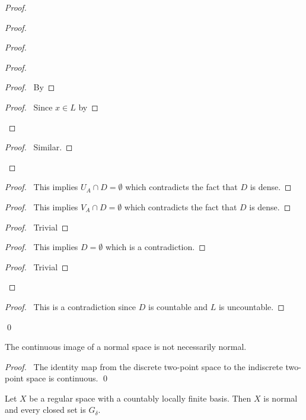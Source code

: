 \begin{proof}
\begin{proof}
\begin{proof}
\begin{proof}
\begin{proof}
      \pf\ By 
    \end{proof}
    \begin{proof}
      \pf\ Since $x \in L$ by 
    \end{proof}
  \end{proof}
  \begin{proof}
    \pf\ Similar.
  \end{proof}
\end{proof}
\begin{proof}
  \pf\ This implies $U_A \cap D = \emptyset$ which contradicts the fact that
  $D$ is dense.
\end{proof}
\begin{proof}
  \pf\ This implies $V_A \cap D = \emptyset$ which contradicts the fact that
  $D$ is dense.
\end{proof}
\begin{proof}
  \pf\ Trivial
\end{proof}
\begin{proof}
  \pf\ This implies $D = \emptyset$ which is a contradiction.
\end{proof}
\begin{proof}
  \pf\ Trivial
\end{proof}
\end{proof}
\qedstep
\begin{proof}
\pf\ This is a contradiction since $D$ is countable and $L$ is uncountable.
\end{proof}
\qed
\end{proof}

\begin{prop}
 The continuous image of a normal space is not necessarily normal.
\end{prop}

\begin{proof}
 \pf\ The identity map from the discrete two-point space to the indiscrete two-point space is continuous. \qed
\end{proof}

\begin{lm}
 \label{lm:topology:normal:regular_countably_locally_finite}
 Let $X$ be a regular space with a countably locally finite basis. Then $X$ is normal and every closed set is $G_\delta$.
\end{lm}

